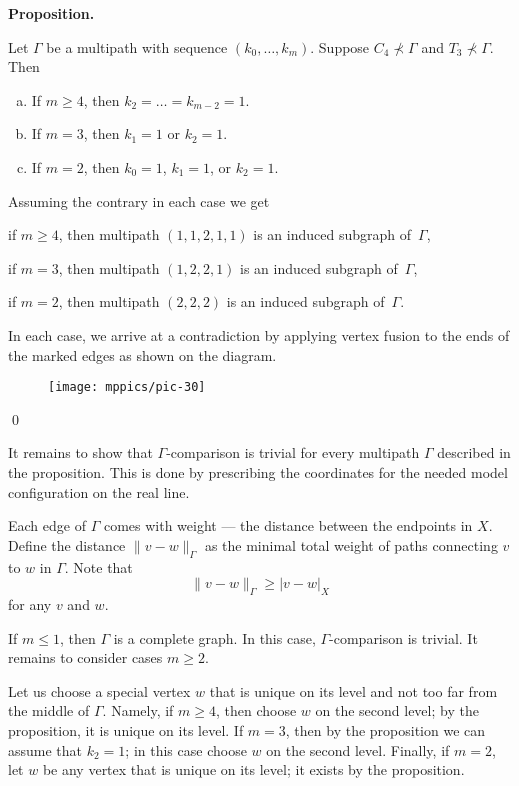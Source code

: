 \documentclass{article}
\def\parit#1{\medskip\noindent{\it #1}}
\def\qeds{\qed\par\medskip}
\def\qedsf{\vskip-6mm\qeds}
\newcounter{thm}[section]
\def\claim#1{\par\medskip\noindent\refstepcounter{thm}\hbox{\bf\boldmath #1.}
\it\ %
}
\def\endclaim{
\par\medskip}
\newenvironment{thm}{\claim}{\endclaim}
\begin{document}
\begin{thm}{Proposition}
Let $\Gamma$ be a multipath with sequence $(k_0,\dots, k_m)$.
Suppose $C_4\nprec\Gamma$ and  $T_3\nprec\Gamma$.
Then 
\begin{enumerate}[(a)]
 \item\label{lem:multipath:5} If $m\geqslant 4$, then $k_2=\dots=k_{m-2}=1$.
 \item\label{lem:multipath:4} If $m= 3$, then $k_1=1$ or $k_2=1$.
 \item\label{lem:multipath:3} If $m= 2$, then $k_0=1$, $k_1=1$, or $k_2=1$.
\end{enumerate}

\end{thm}

\parit{Proof.} Assuming the contrary in each case we get

\parit{(\ref{lem:multipath:5})}
if $m\geqslant 4$, then multipath $(1,1,2,1,1)$ is an induced subgraph of~$\Gamma$,

\parit{(\ref{lem:multipath:4})}
if $m=3$, then multipath $(1,2,2,1)$ is an induced subgraph of~$\Gamma$,

\parit{(\ref{lem:multipath:3})}
if $m=2$, then multipath $(2,2,2)$ is an induced subgraph of~$\Gamma$.

In each case, we arrive at a contradiction by applying vertex fusion to the ends of the marked edges as shown on the diagram.

\begin{figure}[h!]
\centering
\texttt{[image: mppics/pic-30]}
\end{figure}
\qedsf


It remains to show that $\Gamma$-comparison is trivial for every multipath $\Gamma$ described in the proposition.
This is done by prescribing the coordinates for the needed model configuration on the real line.

Each edge of $\Gamma$ comes with weight --- the distance between the endpoints in $X$.
Define the distance $\|v-w\|_\Gamma$ as the minimal total weight of paths connecting $v$ to $w$ in $\Gamma$.
Note that 
\[\|v-w\|_\Gamma\geqslant |v-w|_X\]
for any $v$ and $w$.

If $m\leqslant 1$, then $\Gamma$ is a complete graph.
In this case, $\Gamma$-comparison is trivial.
It remains to consider cases $m\geqslant2$.

Let us choose a special vertex $w$ that is unique on its level and not too far from the middle of $\Gamma$.
Namely, if $m\geqslant 4$, then choose $w$ on the second level;
by the proposition, it is unique on its level.
If $m=3$, then by the proposition we can assume that $k_2=1$; in this case choose $w$ on the second level.
Finally, if $m=2$, let $w$ be any vertex that is unique on its level; it exists by the proposition. 
\end{document}
